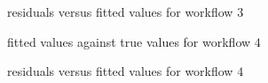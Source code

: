 \documentclass{article}
\begin{document}
\begin{figure}[!htbp]
\centering
{}
\caption{residuals versus fitted values for workflow $3$} \label{1d2_32}
\end{figure}

\begin{figure}[!htbp]
\centering
{}
\caption{fitted values against true values for workflow $4$} \label{1d2_41}
\end{figure}

\begin{figure}[!htbp]
\centering
{}
\caption{residuals versus fitted values for workflow $4$} \label{1d2_42}
\end{figure}
\end{document}
